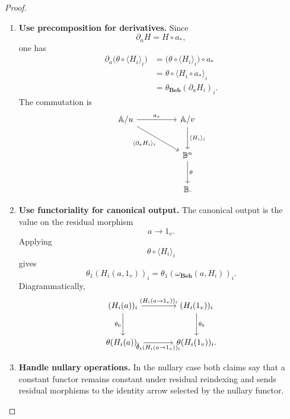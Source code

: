 \begin{proof}
    \leavevmode
    \begin{enumerate}
        \item \textbf{Use precomposition for derivatives.}
        Since
        \[
            \partial_aH=H\circ a_*,
        \]
        one has
        \[
        \begin{aligned}
            \partial_a\bigl(\theta\circ\langle H_i\rangle_i\bigr)
            &=
            \bigl(\theta\circ\langle H_i\rangle_i\bigr)\circ a_* \\
            &=
            \theta\circ\langle H_i\circ a_*\rangle_i \\
            &=
            \theta_{\mathbf{Beh}}(\partial_aH_i)_i.
        \end{aligned}
        \]
        The commutation is
        \[
        \begin{tikzcd}[column sep=huge, row sep=large]
            \mathbb A/u
                \arrow[r, "a_*"]
                \arrow[dr, "{\langle \partial_aH_i\rangle_i}"']
            &
            \mathbb A/v
                \arrow[d, "{\langle H_i\rangle_i}"]
            \\
            &
            \mathbb B^n
                \arrow[d, "\theta"]
            \\
            &
            \mathbb B .
        \end{tikzcd}
        \]

        \item \textbf{Use functoriality for canonical output.}
        The canonical output is the value on the residual morphism
        \[
            a\to 1_v.
        \]
        Applying
        \[
            \theta\circ\langle H_i\rangle_i
        \]
        gives
        \[
            \theta_1(H_i(a,1_v))_i
            =
            \theta_1(\omega_{\mathbf{Beh}}(a,H_i))_i.
        \]
        Diagrammatically,
        \[
        \begin{tikzcd}[column sep=large, row sep=large]
            (H_i(a))_i
                \arrow[r, "{(H_i(a\to 1_v))_i}"]
                \arrow[d, "\theta_0"']
            &
            (H_i(1_v))_i
                \arrow[d, "\theta_0"]
            \\
            \theta(H_i(a))_i
                \arrow[r, "{\theta_1(H_i(a\to 1_v))_i}"']
            &
            \theta(H_i(1_v))_i .
        \end{tikzcd}
        \]

        \item \textbf{Handle nullary operations.}
        In the nullary case both claims say that a constant functor remains
        constant under residual reindexing and sends residual morphisms to the
        identity arrow selected by the nullary functor.
    \end{enumerate}
\end{proof}

